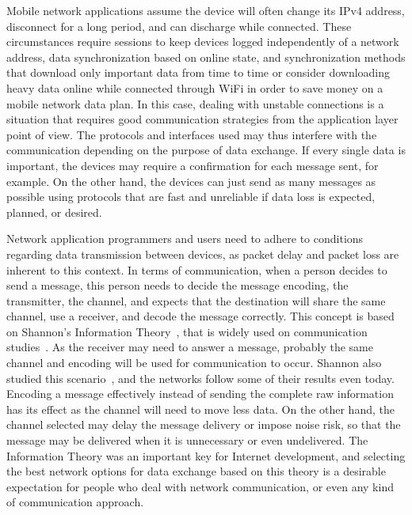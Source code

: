 Mobile network applications assume the device will often change its IPv4 address, disconnect for a long period, and can discharge while connected.
These circumstances require sessions to keep devices logged independently of a network address, data synchronization based on online state, and synchronization methods that download only important data from time to time or consider downloading heavy data online while connected through WiFi in order to save money on a mobile network data plan.
In this case, dealing with unstable connections is a situation that requires good communication strategies from the application layer point of view.
The protocols and interfaces used may thus interfere with the communication depending on the purpose of data exchange.
If every single data is important, the devices may require a confirmation for each message sent, for example.
On the other hand, the devices can just send as many messages as possible using protocols that are fast and unreliable if data loss is expected, planned, or desired.

Network application programmers and users need to adhere to conditions regarding data transmission between devices, as packet delay and packet loss are inherent to this context.
In terms of communication, when a person decides to send a message, this person needs to decide the message encoding, the transmitter, the channel, and expects that the destination will share the same channel, use a receiver, and decode the message correctly.
This concept is based on Shannon's Information Theory~\citep{Shannon1948mathematical}, that is widely used on communication studies~\citep{Fiske2010introduction}.
As the receiver may need to answer a message, probably the same channel and encoding will be used for communication to occur.
Shannon also studied this scenario~\citep{Shannon1961two}, and the networks follow some of their results even today.
Encoding a message effectively instead of sending the complete raw information has its effect as the channel will need to move less data.
On the other hand, the channel selected may delay the message delivery or impose noise risk, so that the message may be delivered when it is unnecessary or even undelivered.
The Information Theory was an important key for Internet development, and selecting the best network options for data exchange based on this theory is a desirable expectation for people who deal with network communication, or even any kind of communication approach.

